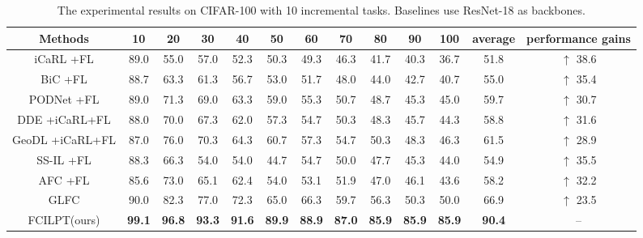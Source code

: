\documentclass[sigconf,anonymous,review,screen]{acmart}
\begin{document}
\begin{table*}[t]\footnotesize
	\centering
	\caption{The experimental results on CIFAR-100 with 10 incremental tasks. Baselines use ResNet-18 as backbones.}
	\label{tab:1}{
		\begin{tabular}{ccccccccccccc}
			\toprule
			Methods & 10 & 20 & 30 & 40 & 50 & 60 & 70 & 80 & 90 & 100 & average & performance gains \\
			\midrule
			iCaRL \cite{rebuffi2017icarl}+FL & 89.0 & 55.0 & 57.0 & 52.3 & 50.3 & 49.3 & 46.3 & 41.7 & 40.3 & 36.7 & 51.8 & $\uparrow$ 38.6  \\
			BiC \cite{wu2019large}+FL & 88.7 & 63.3 & 61.3 & 56.7 & 53.0 & 51.7 & 48.0 & 44.0 & 42.7 & 40.7 & 55.0 & $\uparrow$ 35.4 \\
			PODNet \cite{douillard2020podnet}+FL & 89.0 & 71.3 & 69.0 & 63.3 & 59.0 & 55.3 & 50.7 & 48.7 & 45.3 & 45.0 & 59.7 & $\uparrow$ 30.7 \\
			DDE \cite{hu2021distilling}+iCaRL+FL & 88.0 & 70.0 & 67.3 & 62.0 & 57.3 & 54.7 & 50.3 & 48.3 & 45.7 & 44.3 & 58.8 & $\uparrow$ 31.6 \\
			GeoDL \cite{simon2021learning}+iCaRL+FL & 87.0 & 76.0 & 70.3 & 64.3 & 60.7 & 57.3 & 54.7 & 50.3 & 48.3 & 46.3 & 61.5 & $\uparrow$ 28.9 \\
			SS-IL \cite{ahn2021ss}+FL & 88.3 & 66.3 & 54.0 & 54.0 & 44.7 & 54.7 & 50.0 & 47.7 & 45.3 & 44.0 & 54.9 & $\uparrow$ 35.5 \\
			AFC \cite{kang2022class}+FL & 85.6 & 73.0 & 65.1 & 62.4 & 54.0 & 53.1 & 51.9 & 47.0 & 46.1 & 43.6 & 58.2 & $\uparrow$ 32.2 \\
			GLFC \cite{dong2022federated}& 90.0 & 82.3 & 77.0 & 72.3 & 65.0 & 66.3 & 59.7 & 56.3 & 50.3 & 50.0 & 66.9 & $\uparrow$ 23.5 \\
			FCILPT(ours) & \textbf{99.1} & \textbf{96.8} & \textbf{93.3} & \textbf{91.6} & \textbf{89.9} & \textbf{88.9} & \textbf{87.0} & \textbf{85.9} & \textbf{85.9} & \textbf{85.9} & \textbf{90.4} & -- \\
			\bottomrule
	\end{tabular}	}
\end{table*}
\end{document}
